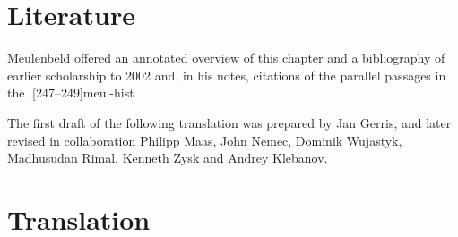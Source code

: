 \section{Literature} 

Meulenbeld offered an annotated overview of this chapter and a
bibliography of earlier scholarship to 2002 and, in his notes, citations
of the parallel passages in the \CS.[247--249]{meul-hist}   

The first draft of the following translation was prepared by Jan
Gerris, and later revised in collaboration Philipp Maas, John Nemec,
Dominik Wujastyk, Madhusudan Rimal, Kenneth Zysk and Andrey Klebanov.

\newpage

\section{Translation}

